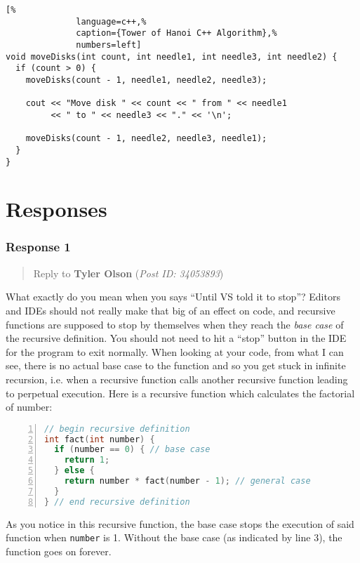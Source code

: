 \documentclass[12pt]{article}
\theoremstyle{definition}
\theoremstyle{plain}
\begin{document}
            \newpage
            \begin{lstlisting}[%
              language=c++,%
              caption={Tower of Hanoi C++ Algorithm},%
              numbers=left]
void moveDisks(int count, int needle1, int needle3, int needle2) {
  if (count > 0) {
    moveDisks(count - 1, needle1, needle2, needle3);

    cout << "Move disk " << count << " from " << needle1
         << " to " << needle3 << "." << '\n';

    moveDisks(count - 1, needle2, needle3, needle1);
  }
}
            \end{lstlisting}


  \newpage
  \part{Responses}

    \section{Response 1}
      \begin{quote}
        Reply to \textbf{Tyler Olson} (\textit{Post ID: 34053893})
      \end{quote}
      What exactly do you mean when you says ``Until VS told it to stop''?
        Editors and IDEs should not really make that big of an effect on code,
        and recursive functions are supposed to stop by themselves when they
        reach the \textit{base case} of the recursive definition. You should not
        need to hit a ``stop'' button in the IDE for the program to exit
        normally. When looking at your code, from what I can see, there is no
        actual base case to the function and so you get stuck in infinite
        recursion, i.e. when a recursive function calls another recursive
        function leading to perpetual execution. Here is a recursive function
        which calculates the factorial of number:

        \begin{lstlisting}[language=c++,numbers=left]
// begin recursive definition
int fact(int number) {
  if (number == 0) { // base case
    return 1;
  } else {
    return number * fact(number - 1); // general case
  }
} // end recursive definition
        \end{lstlisting}

      As you notice in this recursive function, the base case stops the
        execution of said function when \texttt{number} is 1. Without the base
        case (as indicated by line 3), the function goes on forever.
\end{document}
